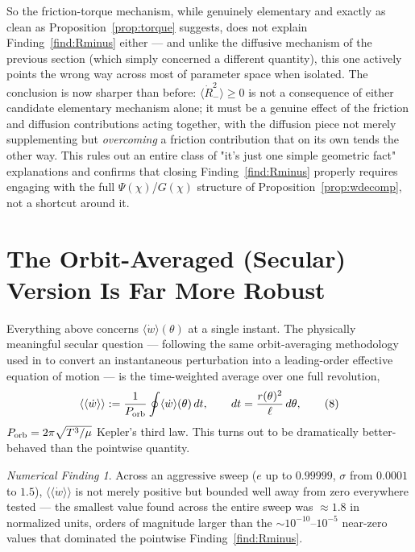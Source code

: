 \documentclass[12pt]{amsart}
\theoremstyle{plain}
\theoremstyle{remark}
\newtheorem*{finding}{Numerical Finding}
\begin{document}
So the friction-torque mechanism, while genuinely elementary and exactly as clean as Proposition~\ref{prop:torque} suggests, does not explain Finding~\ref{find:Rminus} either --- and unlike the diffusive mechanism of the previous section (which simply concerned a different quantity), this one actively points the wrong way across most of parameter space when isolated. The conclusion is now sharper than before: $\langle\dot R_-^2\rangle\geq0$ is not a consequence of either candidate elementary mechanism alone; it must be a genuine effect of the friction and diffusion contributions acting together, with the diffusion piece not merely supplementing but \emph{overcoming} a friction contribution that on its own tends the other way. This rules out an entire class of "it's just one simple geometric fact" explanations and confirms that closing Finding~\ref{find:Rminus} properly requires engaging with the full $\Psi(\chi)$/$G(\chi)$ structure of Proposition~\ref{prop:wdecomp}, not a shortcut around it.

\section{The Orbit-Averaged (Secular) Version Is Far More Robust}\label{sec:orbitaverage}

Everything above concerns $\langle\dot w\rangle(\theta)$ at a single instant. The physically meaningful secular question --- following the same orbit-averaging methodology used in \cite{Ebert2026EFT} to convert an instantaneous perturbation into a leading-order effective equation of motion --- is the time-weighted average over one full revolution,
\begin{equation}
\langle\langle\dot w\rangle\rangle := \frac{1}{P_{\rm orb}}\oint\langle\dot w\rangle(\theta)\,dt, \qquad dt=\frac{r(\theta)^2}{\ell}\,d\theta, \tag{8}
\end{equation}
$P_{\rm orb}=2\pi\sqrt{T^3/\mu}$ Kepler's third law. This turns out to be dramatically better-behaved than the pointwise quantity.

\begin{finding}\label{find:orbitavg}
Across an aggressive sweep ($e$ up to $0.99999$, $\sigma$ from $0.0001$ to $1.5$), $\langle\langle\dot w\rangle\rangle$ is not merely positive but bounded well away from zero everywhere tested --- the smallest value found across the entire sweep was $\approx1.8$ in normalized units, orders of magnitude larger than the $\sim10^{-10}$--$10^{-5}$ near-zero values that dominated the pointwise Finding~\ref{find:Rminus}.
\end{finding}
\end{document}
